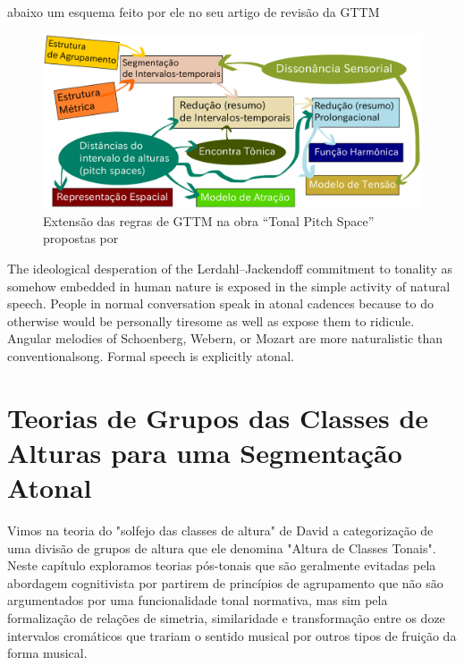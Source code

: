 \documentclass[
	12pt,				%
	openright,			%
	twoside,			%
	a4paper,			%
	english,			%
	french,				%
	spanish,			%
	brazil				%
	]{abntex2}
\begin{document}
abaixo um esquema feito por ele no seu artigo de revisão da GTTM
\begin{figure}[!h]
	\caption{\label{fig_grafico}Extensão das regras de GTTM na obra “Tonal Pitch Space” propostas por  }
	\begin{center}
	    \includegraphics[scale=0.5]{gttm/GTTM_TPS_rules.pdf}
	\end{center}
\end{figure}


\begin{citacao}
The ideological desperation of the Lerdahl–Jackendoff commitment to tonality as somehow embedded in human nature is exposed in the simple activity of natural speech. People in normal conversation speak in atonal cadences because to do otherwise would be personally tiresome as well as expose them to ridicule.
Angular melodies of Schoenberg, Webern, or Mozart are more naturalistic than conventionalsong. Formal speech is explicitly atonal.
\end{citacao}







\chapter{Teorias de Grupos das Classes de Alturas para uma Segmentação Atonal }
\label{modelos}

Vimos na teoria do "solfejo das classes de altura"\cite[p. 115]{temperley2004cognition} de David  a categorização de uma divisão de grupos de altura que ele denomina "Altura de Classes Tonais"\cite[p. 115]{temperley2004cognition}. Neste capítulo exploramos teorias pós-tonais que são geralmente evitadas pela abordagem cognitivista por partirem de princípios de agrupamento que não são argumentados por uma funcionalidade tonal normativa, mas sim pela formalização de relações de simetria, similaridade e transformação entre os doze intervalos cromáticos que trariam o sentido musical por outros tipos de fruição da forma musical. 
\end{document}
